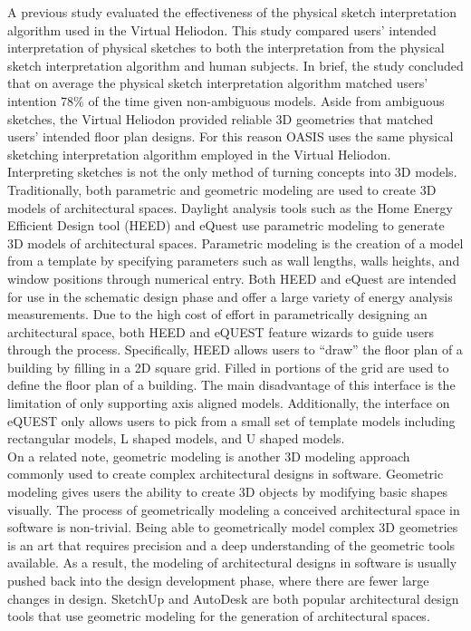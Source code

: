 	A previous study evaluated the effectiveness of the physical sketch interpretation algorithm used in the Virtual Heliodon\cite{cutler2009inferring}.
	This study compared users' intended interpretation of physical sketches to both the
	interpretation from the physical sketch interpretation algorithm and human subjects.
	In brief, the study concluded that on average the physical sketch interpretation algorithm matched users' intention 78\% of the time given non-ambiguous models\cite{cutler2009inferring}.
	Aside from ambiguous sketches, the Virtual Heliodon provided reliable 3D geometries that matched users' intended floor plan designs.
	For this reason OASIS uses the same physical sketching interpretation algorithm employed in the Virtual Heliodon.\\

	Interpreting sketches is not the only method of turning concepts into 3D models.
	Traditionally, both parametric and geometric modeling are used to create 3D models of architectural spaces.
	Daylight analysis tools such as the Home Energy Efficient Design tool (HEED) and eQuest use parametric modeling to generate 3D models of architectural spaces\cite{hirsch2010equest,milne2001drag}.
	Parametric modeling is the creation of a model from a template by specifying parameters such as wall lengths, walls heights, and window positions through numerical entry.
	Both HEED and eQuest are intended for use in the schematic design phase and offer a large variety of energy analysis measurements.
	Due to the high cost of effort in parametrically designing an architectural space, both HEED and eQUEST feature wizards to guide users through the process. 
	Specifically, HEED allows users to ``draw'' the floor plan of a building by filling in a 2D square grid. Filled in portions of the grid are used to define the floor plan of a building. The main disadvantage of this interface is the limitation of only supporting axis aligned models. 
	Additionally, the interface on eQUEST only allows users to pick from a small set of template models including rectangular models, L shaped models, and U shaped models.\\

	On a related note, geometric modeling is another 3D modeling approach commonly used to create complex architectural designs in software.
	Geometric modeling gives users the ability to create 3D objects by modifying basic shapes visually.
	The process of geometrically modeling a conceived architectural space in software is non-trivial.
	Being able to geometrically model complex 3D geometries is an art that requires precision and a deep understanding of the geometric tools available.
	As a result, the modeling of architectural designs in software is usually pushed back into the design development phase, where there are fewer large changes in design\cite{Galasiu}.
	SketchUp and AutoDesk are both popular architectural design tools that use geometric modeling for the generation of architectural spaces\cite{todo,todo}. \\

